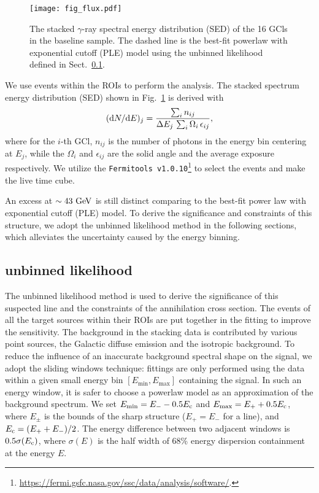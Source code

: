 \documentclass[
	twocolumn,
]{aastex6} %
\newcommand{\gr}{$\gamma$-ray\xspace}
\begin{document}
\begin{figure}
    \centering
	\texttt{[image: fig\_flux.pdf]}
    \caption{\label{fig:flux}
		The stacked \gr spectral energy distribution (SED) of the 16 GCls in the baseline sample.
		The dashed line is the best-fit powerlaw with exponential cutoff (PLE) model using the unbinned likelihood defined in Sect.~\ref{sec::data_analysis:unbinned_like}.
    }
\end{figure}

We use events within the ROIs to perform the analysis.
The stacked spectrum energy distribution (SED) shown in Fig.~\ref{fig:flux} is derived with
\begin{equation}
	({\rm d}N/{\rm d}E)_j = \frac{ \sum_i n_{ij}}{\Delta E_j\,\sum_i \Omega_i\,\epsilon_{ij}},
\end{equation}
where for the $i$-th GCl, $n_{ij}$ is the number of photons in the energy bin centering at $E_j$, while the $\Omega_i$ and $\epsilon_{ij}$ are the solid angle and the average exposure respectively.
We utilize the {\tt Fermitools v1.0.10}\footnote{\url{https://fermi.gsfc.nasa.gov/ssc/data/analysis/software/}.} to select the events and make the live time cube.

An excess at $\sim 43~\rm GeV$ is still distinct comparing to the best-fit power law with exponential cutoff (PLE) model.
To derive the significance and constraints of this structure, we adopt the unbinned likelihood method in the following sections, which alleviates the uncertainty caused by the energy binning.

\subsection{unbinned likelihood}\label{sec::data_analysis:unbinned_like}
The unbinned likelihood method is used to derive the significance of this suspected line and the constraints of the annihilation cross section.
The events of all the target sources within their ROIs are put together in the fitting to improve the sensitivity.
The background in the stacking data is contributed by various point sources, the Galactic diffuse emission and the isotropic background.
To reduce the influence of an inaccurate background spectral shape on the signal, we adopt the sliding windows technique:
fittings are only performed using the data within a given small energy bin $[E_{\min},E_{\max}]$ containing the signal.
In such an energy window, it is safer to choose a powerlaw model as an approximation of the background spectrum.
We set $E_{\min}=E_- - 0.5E_{\rm c}$ and $E_{\max}=E_+ + 0.5E_{\rm c}$, where $E_\pm$ is the bounds of the sharp structure ($E_+=E_-$ for a line), and $E_{\rm c}=(E_++E_-)/2$.
The energy difference between two adjacent windows is $0.5\sigma(E_{\rm c})$, where $\sigma(E)$ is the half width of 68\% energy dispersion containment at the energy $E$.
\end{document}

